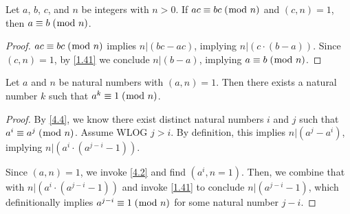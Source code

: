 \documentclass[../main.tex]{subfiles}
\begin{document}
\begin{thm} \label{4.5}
  Let $a$, $b$, $c$, and $n$ be integers with $n > 0$. If $ac \equiv bc \; (\bmod \; n)$ and $(c, n) = 1$, then $a \equiv b \; (\bmod \; n)$.
\end{thm}

\begin{proof}
  $ac \equiv bc \; (\bmod \; n)$ implies $n | (bc - ac)$, implying $n | (c \cdot (b-a))$. Since $(c, n) = 1$, by \ref{1.41} we conclude $n | (b-a)$, implying $a \equiv b \; (\bmod \; n)$.
\end{proof}



\begin{thm} \label{4.6}
  Let $a$ and $n$ be natural numbers with $(a, n) = 1$. Then there exists a natural number $k$ such that $a^k \equiv 1 \; (\bmod \; n)$.
\end{thm}

\begin{proof}
  By \ref{4.4}, we know there exist distinct natural numbers $i$ and $j$ such that $a^i \equiv a^j \; (\bmod \; n)$. Assume WLOG $j > i$. By definition, this implies $n | (a^j - a^i)$, implying $n | (a^i \cdot (a^{j-i} - 1))$.

  Since $(a, n) = 1$, we invoke \ref{4.2} and find $(a^i, n = 1)$. Then, we combine that with $n | (a^i \cdot (a^{j-i} - 1))$ and invoke \ref{1.41} to conclude $n | (a^{j-i} - 1)$, which definitionally implies $a^{j-i} \equiv 1 \; (\bmod \; n)$ for some natural number $j-i$.
\end{proof}
\end{document}
